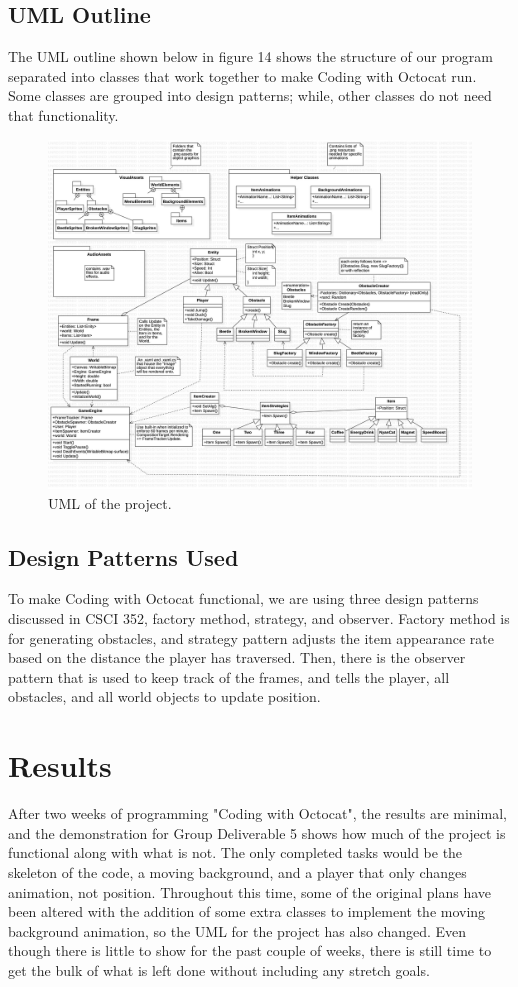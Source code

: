 \documentclass[10pt,conference,onecolumn,compsoc]{IEEEtran}
\begin{document}
\subsection{UML Outline}
The UML outline shown below in figure 14 shows the structure of our program separated into classes that work together to make Coding with Octocat run. Some classes are grouped into design patterns; while, other classes do not need that functionality.

\clearpage

\begin{figure}[!ht]
\centering
\includegraphics[scale=.18]{UML.jpg}
\caption{UML of the project.}
\end{figure}

\subsection{Design Patterns Used}
To make Coding with Octocat functional, we are using three design patterns discussed in CSCI 352, factory method, strategy, and observer. Factory method is for generating obstacles, and strategy pattern adjusts the item appearance rate based on the distance the player has traversed. Then, there is the observer pattern that is used to keep track of the frames, and tells the player, all obstacles, and all world objects to update position.

\section{Results}
After two weeks of programming "Coding with Octocat", the results are minimal, and the demonstration for Group Deliverable 5 shows how much of the project is functional along with what is not. The only completed tasks would be the skeleton of the code, a moving background, and a player that only changes animation, not position. Throughout this time, some of the original plans have been altered with the addition of some extra classes to implement the moving background animation, so the UML for the project has also changed. Even though there is little to show for the past couple of weeks, there is still time to get the bulk of what is left done without including any stretch goals.
\end{document}
